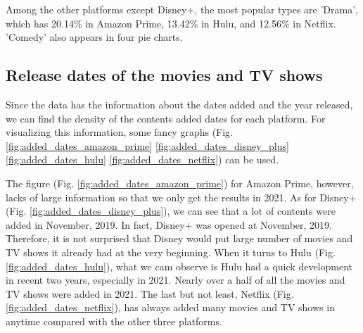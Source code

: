 \documentclass{article}
\begin{document}
Among the other platforms except Disney+, the most popular types are 'Drama', 
which has 20.14\% in Amazon Prime, 13.42\% in Hulu, and 12.56\% in Netflix. 
'Comedy' also appears in four pie charts.

\subsection{Release dates of the movies and TV shows}

Since the data has the information about the dates added and the year released, 
we can find the density of the contents added dates for each platform. For 
visualizing this information, some fancy graphs (Fig. 
\ref{fig:added_dates_amazon_prime}
\ref{fig:added_dates_disney_plus}
\ref{fig:added_dates_hulu}
\ref{fig:added_dates_netflix}) 
can be used.

The figure (Fig. \ref{fig:added_dates_amazon_prime}) for Amazon Prime, 
however, lacks of large information so that we only get the results in 2021. As 
for Disney+ (Fig. \ref{fig:added_dates_disney_plus}), we can see that a lot of 
contents were added in November, 2019. In fact, Disney+ was opened at November, 
2019. Therefore, it is not surprised that Disney would put large number of movies 
and TV shows it already had at the very beginning. When it turns to Hulu 
(Fig. \ref{fig:added_dates_hulu}), what we cam observe is Hulu had a quick 
development in recent two years, especially in 2021. Nearly over a half of all 
the movies and TV shows were added in 2021. The last but not least, Netflix 
(Fig. \ref{fig:added_dates_netflix}), has always added many movies and TV shows 
in anytime compared with the other three platforms.
\end{document}
